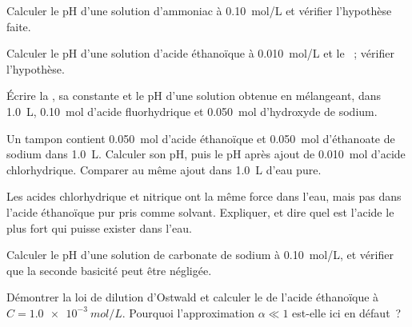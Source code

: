 \begin{exercise}[$\star\star$]\label{exo:b1:predominant-reaction:5}
Calculer le pH d'une solution d'ammoniac à \qty{0.10}{mol/L} et vérifier
l'hypothèse faite.
\end{exercise}

\begin{exercise}[$\star\star$]\label{exo:b1:predominant-reaction:6}
Calculer le pH d'une solution d'acide éthanoïque à \qty{0.010}{mol/L} et
le ~; vérifier l'hypothèse.
\end{exercise}

\begin{exercise}[$\star\star$]\label{exo:b1:predominant-reaction:7}
Écrire la , sa constante et le pH d'une solution
obtenue en mélangeant, dans \qty{1.0}{L}, \qty{0.10}{mol} d'acide
fluorhydrique et \qty{0.050}{mol} d'hydroxyde de sodium.
\end{exercise}

\begin{exercise}[$\star\star$]\label{exo:b1:predominant-reaction:8}
Un tampon contient \qty{0.050}{mol} d'acide éthanoïque et
\qty{0.050}{mol} d'éthanoate de sodium dans \qty{1.0}{L}. Calculer son
pH, puis le pH après ajout de \qty{0.010}{mol} d'acide chlorhydrique.
Comparer au même ajout dans \qty{1.0}{L} d'eau pure.
\end{exercise}

\begin{exercise}[$\star\star$]\label{exo:b1:predominant-reaction:9}
Les acides chlorhydrique et nitrique ont la même force dans l'eau, mais
pas dans l'acide éthanoïque pur pris comme solvant. Expliquer, et dire
quel est l'acide le plus fort qui puisse exister dans l'eau.
\end{exercise}

\begin{exercise}[$\star\star\star$]\label{exo:b1:predominant-reaction:10}
Calculer le pH d'une solution de carbonate de sodium à \qty{0.10}{mol/L},
et vérifier que la seconde basicité peut être négligée.
\end{exercise}

\begin{exercise}[$\star\star\star$]\label{exo:b1:predominant-reaction:11}
Démontrer la loi de dilution d'Ostwald et calculer le  de l'acide éthanoïque à $C = \qty{1.0e-3}{mol/L}$. Pourquoi
l'approximation $\alpha \ll 1$ est-elle ici en défaut~?
\end{exercise}

